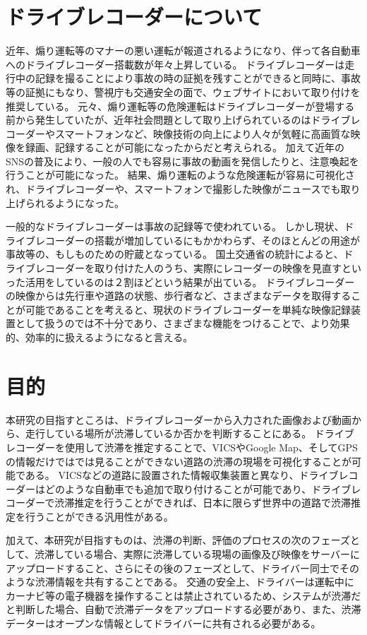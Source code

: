 \section{ドライブレコーダーについて}
近年、煽り運転等のマナーの悪い運転が報道されるようになり、伴って各自動車へのドライブレコーダー搭載数が年々上昇している。
ドライブレコーダーは走行中の記録を撮ることにより事故の時の証拠を残すことができると同時に、事故等の証拠にもなり、警視庁も交通安全の面で、ウェブサイトにおいて取り付けを推奨している。
元々、煽り運転等の危険運転はドライブレコーダーが登場する前から発生していたが、近年社会問題として取り上げられているのはドライブレコーダーやスマートフォンなど、映像技術の向上により人々が気軽に高画質な映像を録画、記録することが可能になったからだと考えられる。
加えて近年のSNSの普及により、一般の人でも容易に事故の動画を発信したりと、注意喚起を行うことが可能になった。
結果、煽り運転のような危険運転が容易に可視化され、ドライブレコーダーや、スマートフォンで撮影した映像がニュースでも取り上げられるようになった。

一般的なドライブレコーダーは事故の記録等で使われている。
しかし現状、ドライブレコーダーの搭載が増加しているにもかかわらず、そのほとんどの用途が事故等の、もしものための貯蔵となっている。
国土交通省の統計によると、ドライブレコーダーを取り付けた人のうち、実際にレコーダーの映像を見直すといった活用をしているのは２割ほどという結果が出ている\cite{ministryofland}。
ドライブレコーダーの映像からは先行車や道路の状態、歩行者など、さまざまなデータを取得することが可能であることを考えると、現状のドライブレコーダーを単純な映像記録装置として扱うのでは不十分であり、さまざまな機能をつけることで、より効果的、効率的に扱えるようになると言える。

\section{目的}
本研究の目指すところは、ドライブレコーダーから入力された画像および動画から、走行している場所が渋滞しているか否かを判断することにある。
ドライブレコーダーを使用して渋滞を推定することで、VICSやGoogle Map、そしてGPSの情報だけではでは見ることができない道路の渋滞の現場を可視化することが可能である。
VICSなどの道路に設置された情報収集装置と異なり、ドライブレコーダーはどのような自動車でも追加で取り付けることが可能であり、ドライブレコーダーで渋滞推定を行うことができれば、日本に限らず世界中の道路で渋滞推定を行うことができる汎用性がある。

加えて、本研究が目指すものは、渋滞の判断、評価のプロセスの次のフェーズとして、渋滞している場合、実際に渋滞している現場の画像及び映像をサーバーにアップロードすること、さらにその後のフェーズとして、ドライバー同士でそのような渋滞情報を共有することである。
交通の安全上、ドライバーは運転中にカーナビ等の電子機器を操作することは禁止されているため、システムが渋滞だと判断した場合、自動で渋滞データをアップロードする必要があり、また、渋滞データーはオープンな情報としてドライバーに共有される必要がある。

